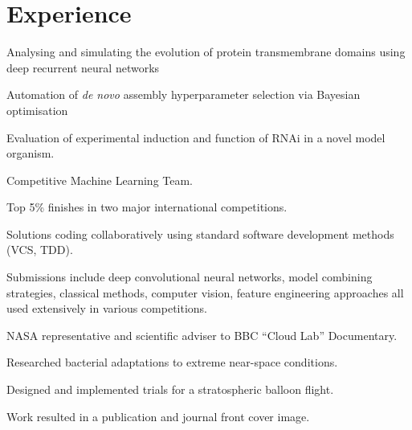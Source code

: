 \documentclass[]{Finlay_Maguire_CV}
\begin{document}
\begin{minipage}[t]{0.66\textwidth} 


\section{Experience}
\sectionsep
\begin{tightemize}
\item Analysing and simulating the evolution of protein transmembrane domains using deep recurrent neural networks
\item Automation of \textit{de novo} assembly hyperparameter selection via Bayesian optimisation
\item Evaluation of experimental induction and function of RNAi in a novel model organism.
\end{tightemize}

\begin{tightemize}
\item Competitive Machine Learning Team.
\item Top 5\% finishes in two major international competitions.
\item Solutions coding collaboratively using standard software development methods (VCS, TDD).
\item Submissions include deep convolutional neural networks, model combining strategies, classical methods, computer vision, feature engineering approaches all used extensively in various competitions.
\end{tightemize}
\sectionsep

\begin{tightemize}
\item NASA representative and scientific adviser to BBC ``Cloud Lab'' Documentary.
\item Researched bacterial adaptations to extreme near-space conditions.
\item Designed and implemented trials for a stratospheric balloon flight.
\item Work resulted in a publication and journal front cover image.
\end{tightemize}
\sectionsep


\end{minipage}
\end{document}
